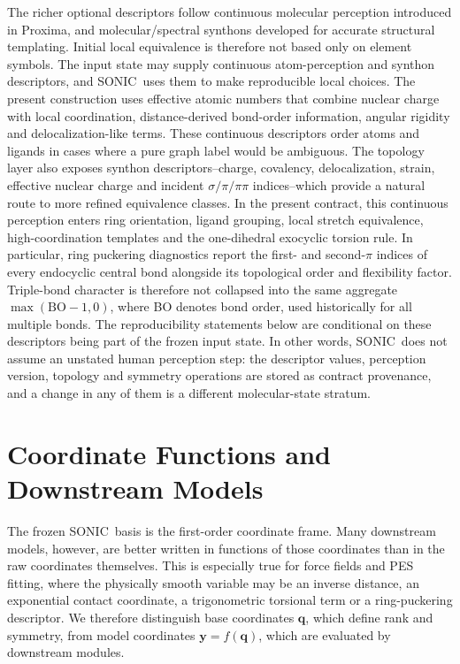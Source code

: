 \documentclass[journal=jctcce,manuscript=article,layout=traditional]{achemso}
\newcommand{\SONIC}{SONIC}
\newcommand{\q}{\mathbf{q}}
\newcommand{\y}{\mathbf{y}}
\theoremstyle{definition}
\begin{document}
The richer optional descriptors follow continuous molecular perception
introduced in Proxima,\cite{Lazzari2020Proxima} and molecular/spectral synthons developed for accurate structural
templating.\cite{Gambi2019Synthons,Lazzari2024SynthonPCS,Lazzari2025PCS141}
Initial local equivalence is therefore not based only on element symbols.  The
input state may supply continuous atom-perception and synthon
descriptors, and \SONIC\ uses them to make reproducible local choices.
The present construction uses effective atomic numbers
that combine nuclear charge with local coordination, distance-derived
bond-order information, angular rigidity and delocalization-like terms.  These
continuous descriptors order atoms and ligands in cases where a pure graph
label would be ambiguous.  The topology layer also exposes synthon
descriptors--charge, covalency, delocalization, strain, effective nuclear
charge and incident $\sigma/\pi/\pi\pi$ indices--which provide a natural route
to more refined equivalence
classes.  In the present contract, this continuous perception enters ring
orientation, ligand grouping, local stretch equivalence, high-coordination
templates and the one-dihedral exocyclic torsion rule.  In particular, ring
puckering diagnostics report the first- and second-$\pi$ indices of every
endocyclic central bond alongside its topological order and flexibility factor.
Triple-bond character is therefore not collapsed into the same aggregate
$\max(\mathrm{BO}-1,0)$, where BO denotes bond order, used historically for
all multiple bonds.
The reproducibility statements below are conditional on these descriptors being
part of the frozen input state.  In other words, \SONIC\ does not assume an
unstated human perception step: the descriptor values, perception version,
topology and symmetry operations are stored as contract provenance, and a
change in any of them is a different molecular-state stratum.

\section{Coordinate Functions and Downstream Models}

The frozen \SONIC\ basis is the first-order coordinate frame.  Many downstream
models, however, are better written in functions of those coordinates than in
the raw coordinates themselves.  This is especially true for force fields and
PES fitting, where the physically smooth variable may be an inverse distance,
an exponential contact coordinate, a trigonometric torsional term or a
ring-puckering descriptor.  We therefore distinguish base coordinates
\(\q\), which define rank and symmetry, from model coordinates
\(\y=f(\q)\), which are evaluated by downstream modules.
\end{document}
